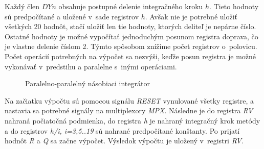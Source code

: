 Každý člen $ DYn $ obsahuje postupné delenie integračného kroku $ h $. Tieto hodnoty sú predpočítané a uložené v~sade registrov $ h $. Avšak nie je potrebné uložiť všetkých 20 hodnôt, stačí uložiť len tie hodnoty, ktorých deliteľ je nepárne číslo. Ostatné hodnoty je možné vypočítať jednoduchým posunom registra doprava, čo je vlastne delenie číslom 2. Týmto spôsobom znížime počet registrov o~polovicu. Počet operácií potrebných na výpočet sa nezvýši, keďže posun registra je možné vykonávať v~predstihu a paralelne s~inými operáciami.

\bigskip
\begin{figure}[h]
\centering
{}
\caption{Paralelno-paralelný násobiaci integrátor \cite{ZavadaBP}}
\label{ppni}
\end{figure}

Na začiatku výpočtu sú pomocou signálu \textit{RESET} vynulované všetky registre, a nastavia sa potrebné signály na multiplexory \textit{MPX}. Následne je do registra \textit{RV} nahraná počiatočná podmienka, do registra \textit{h} je nahraný integračný krok metódy a do registrov \textit{h/i, i=3,5..19} sú nahrané predpočítané konštanty. Po prijatí hodnôt \textit{R} a \textit{Q} sa začne výpočet. Výsledok výpočtu je uložený v~registri \textit{RV}.


